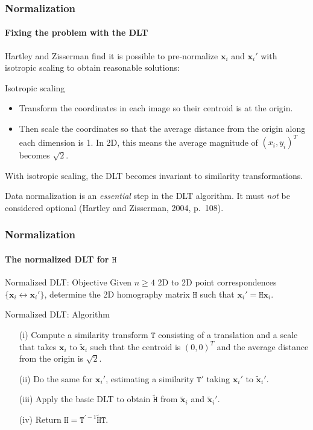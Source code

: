 \documentclass[aspectratio=169]{beamer}
\renewcommand{\vec}[1]{\boldsymbol{#1}}
\newcommand{\mat}[1]{\mathtt{#1}}
\begin{document}
\begin{frame}
\frametitle{Normalization}
\framesubtitle{Fixing the problem with the DLT}

Hartley and Zisserman find it is possible to \alert{pre-normalize}
$\vec{x}_i$ and $\vec{x}_i'$ with \alert{isotropic scaling} to obtain
reasonable solutions:

\begin{block}{Isotropic scaling}
\begin{itemize}
\item Transform the coordinates in each image so their centroid is at
  the origin.
\item Then scale the coordinates so that the average distance from the
  origin along each dimension is 1. In 2D, this means the
  average magnitude of $(x_i,y_i)^T$ becomes $\sqrt{2}$.
\end{itemize}
\end{block}

\medskip

With isotropic scaling, the DLT becomes invariant to similarity
transformations.

\begin{block}{}
Data normalization is an {\em essential} step in the DLT algorithm.
It must {\em not} be considered optional (Hartley and Zisserman, 2004,
p.\ 108).
\end{block}

\end{frame}

\begin{frame}
\frametitle{Normalization}
\framesubtitle{The normalized DLT for $\mat{H}$}

\begin{block}{Normalized DLT: Objective}
Given $n \ge 4$ 2D to 2D point correspondences $\{ \vec{x}_i
\leftrightarrow \vec{x}_i' \}$, determine the 2D homography matrix
$\mat{H}$ such that $\vec{x}_i' = \mat{H}\vec{x}_i$.
\end{block}

\begin{block}{Normalized DLT: Algorithm}
\begin{itemize}
\item[(i)] Compute a similarity transform $\mat{T}$ consisting of a
  translation and a scale that takes $\vec{x}_i$ to
  $\tilde{\vec{x}}_i$ such that the centroid is $(0,0)^T$ and the
  average distance from the origin is $\sqrt{2}$.
\item[(ii)] Do the same for $\vec{x}_i'$, estimating a similarity
  $\mat{T}'$ taking $\vec{x}_i'$ to $\tilde{\vec{x}}_i'$.
\item[(iii)] Apply the \alert{basic DLT} to obtain $\tilde{\mat{H}}$
  from $\tilde{\vec{x}}_i$ and $\tilde{\vec{x}}_i'$.
\item[(iv)] Return $\mat{H}=\mat{T}^{\prime -1} \tilde{\mat{H}} \mat{T}$.
\end{itemize}
\end{block}

\end{frame}
\end{document}
